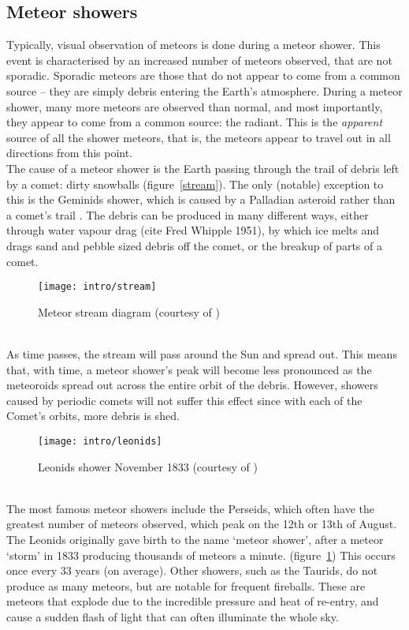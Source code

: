 \subsection{Meteor showers}
Typically, visual observation of meteors is done during a meteor shower. This event is characterised by an increased number of meteors observed, that are not sporadic. Sporadic meteors are those that do not appear to come from a common source -- they are simply debris entering the Earth's atmosphere. During a meteor shower, many more meteors are observed than normal, and most importantly, they appear to come from a common source: the radiant. This is the {\it apparent} source of all the shower meteors, that is, the meteors appear to travel out in all directions from this point.\\
The cause of a meteor shower is the Earth passing through the trail of debris left by a comet: dirty snowballs (figure~\ref{stream}). The only (notable) exception to this is the Geminids shower, which is caused by a Palladian asteroid rather than a comet's trail \cite{palladian}. The debris can be produced in many different ways, either through water vapour drag \cite{watervapour} (cite Fred Whipple 1951), by which ice melts and drags sand and pebble sized debris off the comet, or the breakup of parts of a comet.\\
\begin{figure}[h!]
	\centering
	\texttt{[image: intro/stream]}
	\caption{Meteor stream diagram (courtesy of \cite{stream})}
\end{figure}\\
As time passes, the stream will pass around the Sun and spread out. This means that, with time, a meteor shower's peak will become less pronounced as the meteoroids spread out across the entire orbit of the debris. However, showers caused by periodic comets will not suffer this effect since with each of the Comet's orbits, more debris is shed.\\
\begin{figure}
	\centering
	\texttt{[image: intro/leonids]}
	\caption{Leonids shower November 1833 (courtesy of \cite{leonids}) 
		\label{fig:1833leonids}}
\end{figure}\\
The most famous meteor showers include the Perseids, which often have the greatest number of meteors observed, which peak on the 12th or 13th of August. The Leonids originally gave birth to the name `meteor shower',  after a meteor `storm' in 1833 producing thousands of meteors a minute. (figure~\ref{fig:1833leonids}) This occurs once every 33 years (on average). Other showers, such as the Taurids, do not produce as many meteors, but are notable for frequent fireballs. These are meteors that explode due to the incredible pressure and heat of re-entry, and cause a sudden flash of light that can often illuminate the whole sky.


